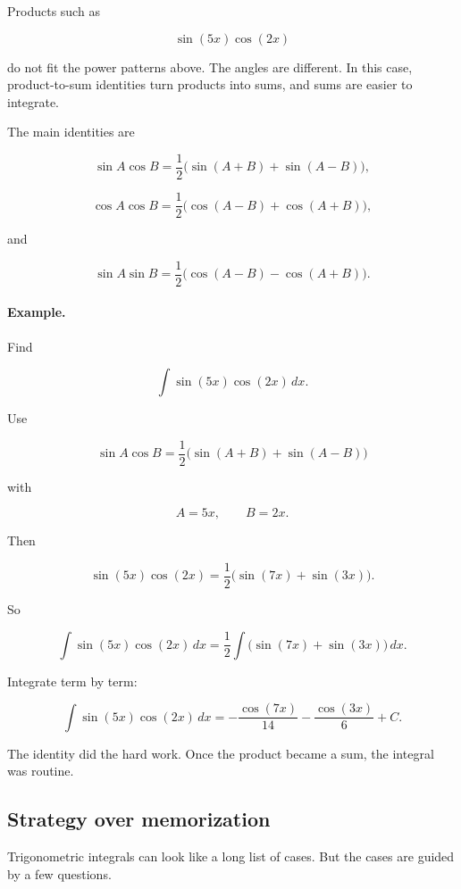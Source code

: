 Products such as

\[
\sin(5x)\cos(2x)
\]

do not fit the power patterns above.  The angles are different.  In this case,
product-to-sum identities turn products into sums, and sums are easier to integrate.

The main identities are

\[
\sin A\cos B
=
\frac12\bigl(\sin(A+B)+\sin(A-B)\bigr),
\]

\[
\cos A\cos B
=
\frac12\bigl(\cos(A-B)+\cos(A+B)\bigr),
\]

and

\[
\sin A\sin B
=
\frac12\bigl(\cos(A-B)-\cos(A+B)\bigr).
\]

\paragraph{Example.}
Find

\[
\int \sin(5x)\cos(2x)\,dx.
\]

Use

\[
\sin A\cos B
=
\frac12\bigl(\sin(A+B)+\sin(A-B)\bigr)
\]

with

\[
A=5x,
\qquad
B=2x.
\]

Then

\[
\sin(5x)\cos(2x)
=
\frac12\bigl(\sin(7x)+\sin(3x)\bigr).
\]

So

\[
\int \sin(5x)\cos(2x)\,dx
=
\frac12\int \bigl(\sin(7x)+\sin(3x)\bigr)\,dx.
\]

Integrate term by term:

\[
\boxed{
\int \sin(5x)\cos(2x)\,dx
=
-\frac{\cos(7x)}{14}-\frac{\cos(3x)}{6}+C.
}
\]

The identity did the hard work.  Once the product became a sum, the integral was
routine.

\subsection{Strategy over memorization}
\label{subsec:trig-integral-strategy}

Trigonometric integrals can look like a long list of cases.  But the cases are guided by
a few questions.

